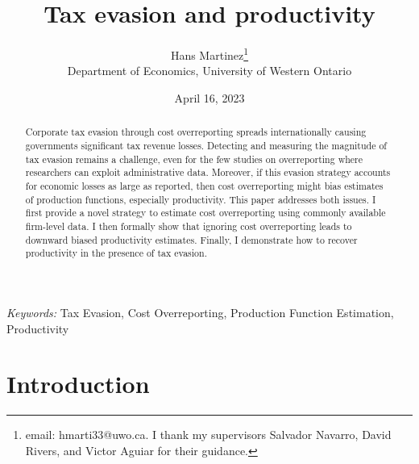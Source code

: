 \documentclass[
  12pt]{article}
\theoremstyle{definition}
\theoremstyle{remark}
\begin{document}
\def\spacingset#1{\renewcommand{\baselinestretch}%
{#1}\small\normalsize} \spacingset{1}



\date{April 16, 2023}
\title{\bf Tax evasion and productivity}
\author{
Hans Martinez\thanks{email: hmarti33@uwo.ca. I thank my supervisors
Salvador Navarro, David Rivers, and Victor Aguiar for their guidance.}\\
Department of Economics, University of Western Ontario\\
}
\maketitle

\bigskip
\bigskip
\begin{abstract}
Corporate tax evasion through cost overreporting spreads internationally
causing governments significant tax revenue losses. Detecting and
measuring the magnitude of tax evasion remains a challenge, even for the
few studies on overreporting where researchers can exploit
administrative data. Moreover, if this evasion strategy accounts for
economic losses as large as reported, then cost overreporting might bias
estimates of production functions, especially productivity. This paper
addresses both issues. I first provide a novel strategy to estimate cost
overreporting using commonly available firm-level data. I then formally
show that ignoring cost overreporting leads to downward biased
productivity estimates. Finally, I demonstrate how to recover
productivity in the presence of tax evasion.
\end{abstract}

\noindent%
{\it Keywords:} Tax Evasion, Cost Overreporting, Production Function
Estimation, Productivity
\vfill

\newpage
\spacingset{1.9} %
\ifdefined\Shaded\renewenvironment{Shaded}{\begin{tcolorbox}[breakable, sharp corners, boxrule=0pt, frame hidden, enhanced, interior hidden, borderline west={3pt}{0pt}{shadecolor}]}{\end{tcolorbox}}\fi

\hypertarget{introduction}{%
\section*{Introduction}\label{introduction}}
\end{document}
